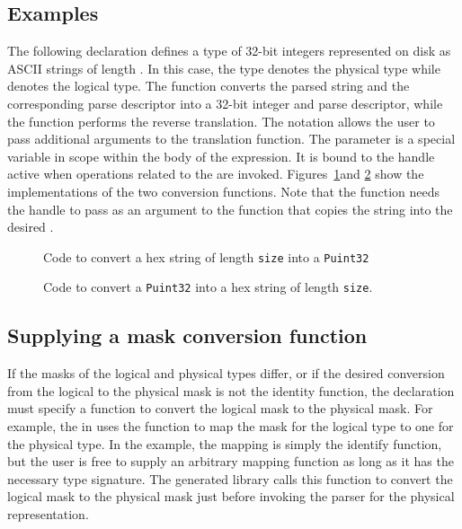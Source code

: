 \subsection{Examples}
The following \Ptrans{} declaration defines a type of 32-bit integers
represented on disk as ASCII strings of length .
\noindent
In this case, the type  denotes the physical type
while  denotes the logical type.  The function
 converts the parsed string and the corresponding parse
descriptor into a 32-bit integer and parse descriptor, while
the function  performs the reverse translation.  
The notation  allows the user to pass
additional arguments to the translation function.  The parameter
 is a special variable in scope within the body of the
\ptrans{} expression.  It is bound to the \pads{} handle active 
when operations related to the \ptrans{} are invoked.
Figures~\ref{fig:trans-toInt32}and \ref{fig:trans-toHexString} show
the implementations of the two conversion functions.  Note that the
function  needs the \pads{} handle to pass as an
argument to the  function that copies the \C{}
string  into the desired .  

\begin{figure}
\caption{Code to convert a hex string of length \texttt{size} into a \texttt{Puint32}}
\label{fig:trans-toInt32}
\end{figure}

\begin{figure}
\caption{Code to convert a \texttt{Puint32} into a hex string of length \texttt{size}.}
\label{fig:trans-toHexString}
\end{figure}

\subsection{Supplying a mask conversion function}
If the masks of the logical and physical types differ, or if the
desired conversion from the logical to the physical mask is not the
identity function, the \Ptrans{} declaration must specify a function
to convert the logical mask to the physical mask.  For example, the
\Ptrans{}  in 
uses the function  to map 
the mask for the logical type to one for the physical type.  In the
example, the mapping is simply the identify function, but the user is
free to supply an arbitrary mapping function as long as it has the
necessary type signature.  The generated library calls this function
to convert the logical mask to the physical mask just before invoking
the parser for the physical representation.

